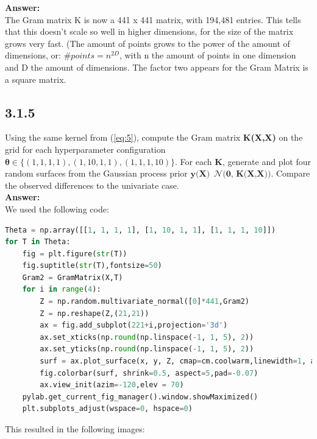 \documentclass[a4paper]{article}
\begin{document}
\textbf{Answer:}\\

The Gram matrix K is now a 441 x 441 matrix, with 194,481 entries. This tells that this doesn't scale so well in higher dimensions, for the size of the matrix grows very fast. (The amount of points grows to the power of the amount of dimensions, or: $\#points = n^{2D}$, with n the amount of points in one dimension and D the amount of dimensions. The factor two appears for the Gram Matrix is a square matrix. 






\subsection*{3.1.5}

Using the same kernel from (\ref{eq:5}), compute the Gram matrix \textbf{K(X,X)} on the grid for each hyperparameter configuration $\boldsymbol{\theta} \in \{(1, 1, 1, 1), (1, 10, 1, 1), (1, 1, 1, 10)\}$. For each \textbf{K}, generate and plot four random surfaces from the Gaussian process prior $\textbf{y(X)} $~$ \mathcal{N}\textbf{(0, K(X,X)})$. Compare the observed differences to the univariate case.\\


\textbf{Answer:}\\


We used the following code:


\begin{lstlisting}[language=Python]
Theta = np.array([[1, 1, 1, 1], [1, 10, 1, 1], [1, 1, 1, 10]])
for T in Theta:
    fig = plt.figure(str(T))
    fig.suptitle(str(T),fontsize=50)
    Gram2 = GramMatrix(X,T)
    for i in range(4):     
        Z = np.random.multivariate_normal([0]*441,Gram2)
        Z = np.reshape(Z,(21,21))
        ax = fig.add_subplot(221+i,projection='3d')
        ax.set_xticks(np.round(np.linspace(-1, 1, 5), 2))
        ax.set_yticks(np.round(np.linspace(-1, 1, 5), 2))
        surf = ax.plot_surface(x, y, Z, cmap=cm.coolwarm,linewidth=1, antialiased=True)
        fig.colorbar(surf, shrink=0.5, aspect=5,pad=-0.07)
        ax.view_init(azim=-120,elev = 70)
    pylab.get_current_fig_manager().window.showMaximized()
    plt.subplots_adjust(wspace=0, hspace=0)
\end{lstlisting}






This resulted in the following images:
\end{document}
